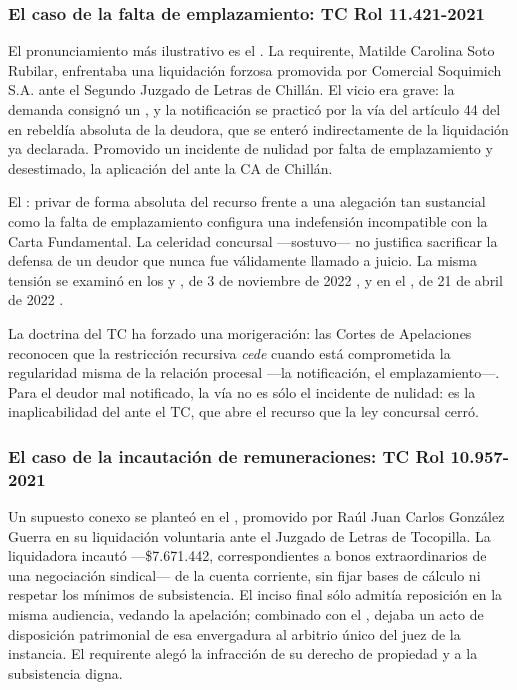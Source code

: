 \subsubsection{El caso de la falta de emplazamiento: TC Rol 11.421-2021}

El pronunciamiento más ilustrativo es el  \parencite{juris-tc-11421-2021}. La
requirente, Matilde Carolina Soto Rubilar, enfrentaba una liquidación forzosa promovida por
Comercial Soquimich S.A. ante el Segundo Juzgado de Letras de Chillán. El vicio era grave: la
demanda consignó un , y la notificación se practicó por la vía
del artículo 44 del \cpc{} en rebeldía absoluta de la deudora, que se enteró indirectamente de la
liquidación ya declarada. Promovido un incidente de nulidad por falta de emplazamiento y
desestimado, la aplicación del    ante la CA
de Chillán.

El \tconst{} : privar de forma absoluta del recurso frente a
una alegación tan sustancial como la falta de emplazamiento configura una indefensión
incompatible con la Carta Fundamental. La celeridad concursal ---sostuvo--- no justifica
sacrificar la defensa de un deudor que nunca fue válidamente llamado a juicio. La misma
tensión se examinó en los  y , de 3 de noviembre de 2022
\parencite{juris-tc-12539-2021, juris-tc-12527-2021}, y en el , de 21 de
abril de 2022 \parencite{juris-tc-9097-2020}.

\begin{foco}
La doctrina del TC ha forzado una morigeración: las Cortes de Apelaciones reconocen que la
restricción recursiva \emph{cede} cuando está comprometida la regularidad misma de la relación
procesal ---la notificación, el emplazamiento---. Para el deudor mal notificado, la vía no es
sólo el incidente de nulidad: es la inaplicabilidad del   ante el TC, que abre el
recurso que la ley concursal cerró.
\end{foco}

\subsubsection{El caso de la incautación de remuneraciones: TC Rol 10.957-2021}

Un supuesto conexo se planteó en el  \parencite{juris-tc-10957-2021}, promovido
por Raúl Juan Carlos González Guerra en su liquidación voluntaria ante el Juzgado de Letras de
Tocopilla. La liquidadora incautó  ---\$7.671.442,
correspondientes a bonos extraordinarios de una negociación sindical--- de la cuenta corriente,
sin fijar bases de cálculo ni respetar los mínimos de subsistencia. El  inciso final
sólo admitía reposición en la misma audiencia, vedando la apelación; combinado con el ,
dejaba un acto de disposición patrimonial de esa envergadura al arbitrio único del juez de la
instancia. El requirente alegó la infracción de su derecho de propiedad y a la subsistencia
digna.

